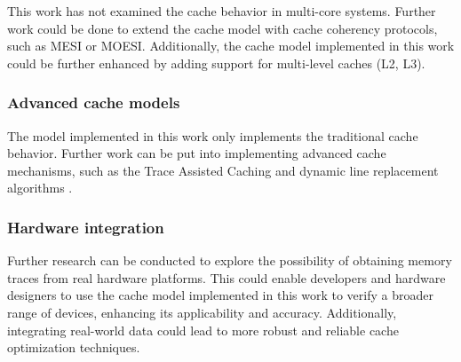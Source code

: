 This work has not examined the cache behavior in multi-core systems. Further work could be done to extend the cache model with cache coherency protocols, such as MESI or MOESI.
Additionally, the cache model implemented in this work could be further enhanced by adding support for multi-level caches (L2, L3).


\subsubsection*{Advanced cache models}

The model implemented in this work only implements the traditional cache behavior. Further work can be put into implementing advanced cache mechanisms, such as
the Trace Assisted Caching \cite{usingtrace} and dynamic line replacement algorithms \cite{dynamiceviction}.

\subsubsection*{Hardware integration}

Further research can be conducted to explore the possibility of obtaining memory traces from real hardware platforms. This could enable developers and hardware designers to use the
cache model implemented in this work to verify a broader range of devices, enhancing its applicability and accuracy. Additionally, integrating real-world data could lead to more
robust and reliable cache optimization techniques.
